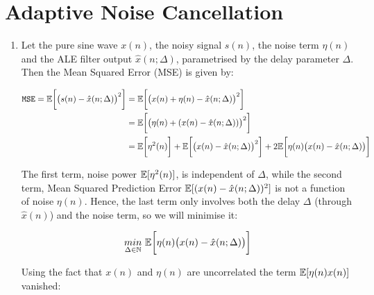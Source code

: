 \section{Adaptive Noise Cancellation}

\begin{enumerate}[label=\alph*), leftmargin=*]

\item
%

Let the pure sine wave $x(n)$, the noisy signal $s(n)$, the noise term $\eta(n)$ and the ALE filter output $\hat{x}(n; \Delta)$, parametrised by the delay parameter $\Delta$.
Then the Mean Squared Error (MSE) is given by:

\begin{align}
    \mathtt{MSE} =
    {\mathbb{E}} \bigg[ \big( s(n) - \hat{x}(n; \Delta) \big)^{2} \bigg]  &=  {\mathbb{E}} \bigg[ \big( x(n) + \eta(n) - \hat{x}(n; \Delta) \big)^{2} \bigg] \\
                                                                &=  {\mathbb{E}} \bigg[ \big( \eta(n) + (x(n) - \hat{x}(n; \Delta)) \big)^{2} \bigg] \\
                                                                &=  {\mathbb{E}} \bigg[ \eta^{2}(n) \bigg] +
                                                                    {\mathbb{E}} \bigg[ \big( x(n) - \hat{x}(n; \Delta) \big)^{2} \bigg] +
                                                                   2{\mathbb{E}} \bigg[ \eta(n) \big(x(n) - \hat{x}(n; \Delta) \big) \bigg]
\label{eq:ale_mse}
\end{align}

The first term, noise power ${\mathbb{E}} [ \eta^{2}(n) ]$, is independent of $\Delta$, while the second term, Mean Squared Prediction Error ${\mathbb{E}} [ (x(n) - \hat{x}(n; \Delta))^{2} ]$ is not
a function of noise $\eta(n)$. Hence, the last term only involves both the delay $\Delta$ (through $\hat{x}(n)$) and the noise term, so we will minimise it:

\begin{equation}
    \underset{\Delta \in {\mathbb{N}}}{min}\ {\mathbb{E}} \bigg[ \eta(n) \big(x(n) - \hat{x}(n; \Delta) \big) \bigg]
\end{equation}

Using the fact that $x(n)$ and $\eta(n)$ are uncorrelated the term ${\mathbb{E}} [ \eta(n) x(n) ]$ vanished:


\end{enumerate}
